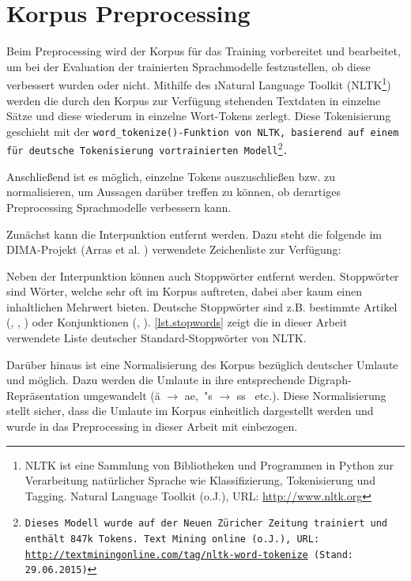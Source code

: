 \section{Korpus Preprocessing}\label{s.preprocessing}
Beim Preprocessing wird der Korpus für das Training vorbereitet und bearbeitet, um bei der Evaluation der trainierten Sprachmodelle festzustellen, ob diese verbessert wurden oder nicht. Mithilfe des \i{Natural Language Toolkit} (NLTK\footnote{NLTK ist eine Sammlung von Bibliotheken und Programmen in Python zur Verarbeitung natürlicher Sprache wie Klassifizierung, Tokenisierung und Tagging. Natural Language Toolkit (o.J.), URL: \url{http://www.nltk.org}}) werden die durch den Korpus zur Verfügung stehenden Textdaten in einzelne Sätze und diese wiederum in einzelne Wort-Tokens zerlegt. Diese Tokenisierung geschieht mit der \tt{word\_tokenize()}-Funktion von NLTK, basierend auf einem für deutsche Tokenisierung vortrainierten Modell\footnote{Dieses Modell wurde auf der Neuen Züricher Zeitung trainiert und enthält 847k Tokens. Text Mining online (o.J.), URL: \url{http://textminingonline.com/tag/nltk-word-tokenize} (Stand: 29.06.2015)}.

Anschließend ist es möglich, einzelne Tokens auszuschließen bzw. zu normalisieren, um Aussagen darüber treffen zu können, ob derartiges Preprocessing Sprachmodelle verbessern kann.

Zunächst kann die Interpunktion entfernt werden. Dazu steht die folgende im DIMA-Projekt (Arras et al. \citep{Arras2014}) verwendete Zeichenliste zur Verfügung:


Neben der Interpunktion können auch Stoppwörter entfernt werden. Stoppwörter sind Wörter, welche sehr oft im Korpus auftreten, dabei aber kaum einen inhaltlichen Mehrwert bieten. Deutsche Stoppwörter sind z.B. bestimmte Artikel (, , ) oder Konjunktionen (, ). \autoref{lst.stopwords} zeigt die in dieser Arbeit verwendete Liste deutscher Standard-Stoppwörter von NLTK.

Darüber hinaus ist eine Normalisierung des Korpus bezüglich deutscher Umlaute und  möglich. Dazu werden die Umlaute in ihre entsprechende Digraph-Repräsentation umgewandelt (ä $\rightarrow$ ae,\ "s $\rightarrow$ ss \ etc.). Diese Normalisierung stellt sicher, dass die Umlaute im Korpus einheitlich dargestellt werden und wurde in das Preprocessing in dieser Arbeit mit einbezogen.

